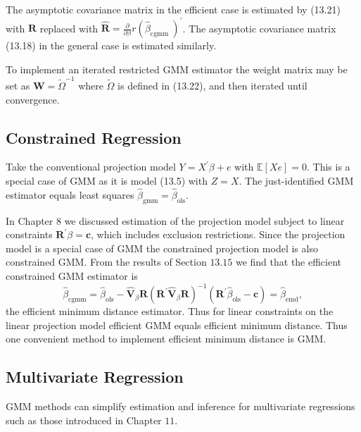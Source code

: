 \documentclass[10pt]{article}
\begin{document}
The asymptotic covariance matrix in the efficient case is estimated by (13.21) with $\boldsymbol{R}$ replaced with $\widehat{\boldsymbol{R}}=\frac{\partial}{\partial \beta} r\left(\widehat{\beta}_{\text {cgmm }}\right)^{\prime}$. The asymptotic covariance matrix (13.18) in the general case is estimated similarly.

To implement an iterated restricted GMM estimator the weight matrix may be set as $\boldsymbol{W}=\widetilde{\Omega}^{-1}$ where $\widetilde{\Omega}$ is defined in (13.22), and then iterated until convergence.

\subsection{Constrained Regression}
Take the conventional projection model $Y=X^{\prime} \beta+e$ with $\mathbb{E}[X e]=0$. This is a special case of GMM as it is model (13.5) with $Z=X$. The just-identified GMM estimator equals least squares $\widehat{\beta}_{\mathrm{gmm}}=\widehat{\beta}_{\mathrm{ols}}$.

In Chapter 8 we discussed estimation of the projection model subject to linear constraints $\boldsymbol{R}^{\prime} \beta=\boldsymbol{c}$, which includes exclusion restrictions. Since the projection model is a special case of GMM the constrained projection model is also constrained GMM. From the results of Section $13.15$ we find that the efficient constrained GMM estimator is
$$
\widehat{\beta}_{\mathrm{cgmm}}=\widehat{\beta}_{\mathrm{ols}}-\widehat{\boldsymbol{V}}_{\beta} \boldsymbol{R}\left(\boldsymbol{R}^{\prime} \widehat{\boldsymbol{V}}_{\beta} \boldsymbol{R}\right)^{-1}\left(\boldsymbol{R}^{\prime} \widehat{\beta}_{\mathrm{ols}}-\boldsymbol{c}\right)=\widehat{\beta}_{\mathrm{emd}},
$$
the efficient minimum distance estimator. Thus for linear constraints on the linear projection model efficient GMM equals efficient minimum distance. Thus one convenient method to implement efficient minimum distance is GMM.

\subsection{Multivariate Regression}
GMM methods can simplify estimation and inference for multivariate regressions such as those introduced in Chapter $11 .$
\end{document}
